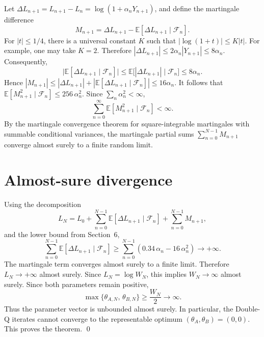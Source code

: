 \documentclass[11pt]{article}
\begin{document}
Let $\Delta L_{n+1} = L_{n+1} - L_n = \log(1 + \alpha_n Y_{n+1})$, and define the martingale difference
\begin{equation}
M_{n+1} = \Delta L_{n+1} - \mathbb{E}[\Delta L_{n+1} \mid \mathcal{F}_n].
\end{equation}
For $|t| \leq 1/4$, there is a universal constant $K$ such that $|\log(1+t)| \leq K|t|$. For example, one may take $K = 2$. Therefore $|\Delta L_{n+1}| \leq 2\alpha_n |Y_{n+1}| \leq 8\alpha_n$. Consequently,
\begin{equation}
\bigl|\mathbb{E}[\Delta L_{n+1} \mid \mathcal{F}_n]\bigr|
\leq \mathbb{E}\bigl[|\Delta L_{n+1}| \mid \mathcal{F}_n\bigr]
\leq 8\alpha_n.
\end{equation}
Hence $|M_{n+1}| \leq |\Delta L_{n+1}| + |\mathbb{E}[\Delta L_{n+1} \mid \mathcal{F}_n]| \leq 16\alpha_n$. It follows that $\mathbb{E}[M_{n+1}^2 \mid \mathcal{F}_n] \leq 256\,\alpha_n^2$. Since $\sum_n \alpha_n^2 < \infty$,
\begin{equation}
\sum_{n=0}^{\infty} \mathbb{E}[M_{n+1}^2 \mid \mathcal{F}_n] < \infty.
\end{equation}
By the martingale convergence theorem for square-integrable martingales with summable conditional variances, the martingale partial sums $\sum_{n=0}^{N-1} M_{n+1}$ converge almost surely to a finite random limit.

\section{Almost-sure divergence}

Using the decomposition
\begin{equation}\label{eq:doob}
L_N = L_0 + \sum_{n=0}^{N-1} \mathbb{E}[\Delta L_{n+1} \mid \mathcal{F}_n] + \sum_{n=0}^{N-1} M_{n+1},
\end{equation}
and the lower bound from Section~6,
\begin{equation}
\sum_{n=0}^{N-1} \mathbb{E}[\Delta L_{n+1} \mid \mathcal{F}_n]
\geq \sum_{n=0}^{N-1} (0.34\,\alpha_n - 16\,\alpha_n^2) \to +\infty.
\end{equation}
The martingale term converges almost surely to a finite limit. Therefore $L_N \to +\infty$ almost surely. Since $L_N = \log W_N$, this implies $W_N \to \infty$ almost surely. Since both parameters remain positive,
\begin{equation}
\max\{\theta_{A,N},\, \theta_{B,N}\} \geq \frac{W_N}{2} \to \infty.
\end{equation}
Thus the parameter vector is unbounded almost surely. In particular, the Double-Q iterates cannot converge to the representable optimum $(\theta_A, \theta_B) = (0,0)$. This proves the theorem. \qed
\end{document}
